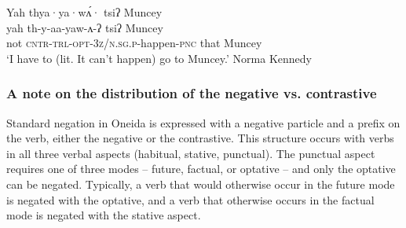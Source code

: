 \documentclass[output=paper,colorlinks,citecolor=brown]{langscibook}
\begin{document}
\ea\label{oneida:have to}
    {\glll Yah thya·ya·wʌ́· tsiʔ Muncey \\
    yah th-y-aa-yaw-ʌ-ʔ tsiʔ Muncey  \\
    not \textsc{cntr-trl-opt-3z/n.sg.p}-happen-\textsc{pnc} that Muncey  \\}
    \glt `I have to (lit. It can't happen) go to Muncey.' Norma Kennedy \citep[92--93 (11)]{MichelsonEtAl2016}
\z

\subsubsection{A note on the distribution of the negative vs. contrastive}
\label{oneida:sec:summary}

Standard negation in Oneida is expressed with a negative particle and a prefix on the verb, either the negative or the contrastive. This structure occurs with verbs in all three verbal aspects (habitual, stative, punctual). The punctual aspect requires one of three modes -- future, factual, or optative -- and only the optative can be negated. Typically, a verb that would otherwise occur in the future mode is negated with the optative, and a verb that otherwise occurs in the factual mode is negated with the stative aspect.
\end{document}
